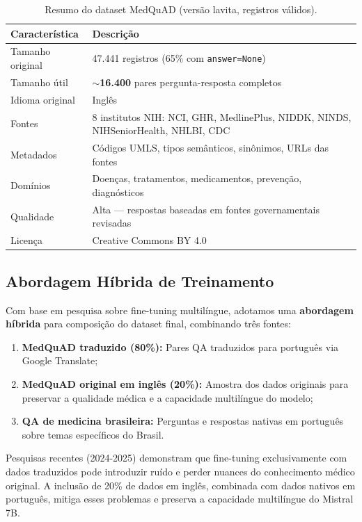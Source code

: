 \begin{table}[H]
\centering
\caption{Resumo do dataset MedQuAD (versão lavita, registros válidos).}
\label{tab:medquad}
\begin{tabularx}{\textwidth}{l X}
\toprule
\textbf{Característica} & \textbf{Descrição} \\
\midrule
Tamanho original  & 47.441 registros (65\% com \texttt{answer=None}) \\
Tamanho útil      & \textbf{$\sim$16.400} pares pergunta-resposta completos \\
Idioma original   & Inglês \\
Fontes            & 8 institutos NIH: NCI, GHR, MedlinePlus, NIDDK, NINDS, NIHSeniorHealth, NHLBI, CDC \\
Metadados         & Códigos UMLS, tipos semânticos, sinônimos, URLs das fontes \\
Domínios          & Doenças, tratamentos, medicamentos, prevenção, diagnósticos \\
Qualidade         & Alta --- respostas baseadas em fontes governamentais revisadas \\
Licença           & Creative Commons BY 4.0 \\
\bottomrule
\end{tabularx}
\end{table}

\subsection{Abordagem Híbrida de Treinamento}

Com base em pesquisa sobre fine-tuning multilíngue, adotamos uma \textbf{abordagem híbrida} para composição do dataset final, combinando três fontes:

\begin{enumerate}
    \item \textbf{MedQuAD traduzido (80\%):} Pares QA traduzidos para português via Google Translate;
    \item \textbf{MedQuAD original em inglês (20\%):} Amostra dos dados originais para preservar a qualidade médica e a capacidade multilíngue do modelo;
    \item \textbf{QA de medicina brasileira:} Perguntas e respostas nativas em português sobre temas específicos do Brasil.
\end{enumerate}

\begin{infobox}
Pesquisas recentes (2024-2025) demonstram que fine-tuning exclusivamente com dados traduzidos pode introduzir ruído e perder nuances do conhecimento médico original. A inclusão de 20\% de dados em inglês, combinada com dados nativos em português, mitiga esses problemas e preserva a capacidade multilíngue do Mistral 7B.
\end{infobox}

